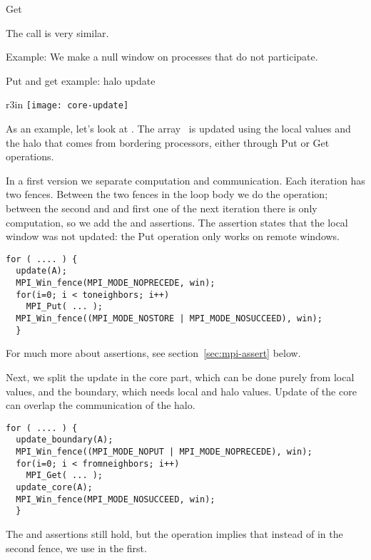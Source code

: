  {Get}

The  call is very similar.

Example:
%
%
We make a null window on processes that do not participate.
%

 {Put and get example: halo update}

\begin{wrapfigure}{r}{3in}
  \texttt{[image: core-update]}
\end{wrapfigure}
%
As an example, let's look at .
The array~ is updated using the local values and the halo
that comes from bordering processors, either through Put or Get operations.

In a first version we separate computation and communication.
Each iteration has two fences. Between the two fences in the loop body
we do the  operation; between the second and and first one
of the next iteration there is only computation, so we add the
 and  assertions. 
The  assertion
states that the local window was not updated: the Put operation only
works on remote windows.
\begin{lstlisting}
for ( .... ) {
  update(A); 
  MPI_Win_fence(MPI_MODE_NOPRECEDE, win); 
  for(i=0; i < toneighbors; i++) 
    MPI_Put( ... );
  MPI_Win_fence((MPI_MODE_NOSTORE | MPI_MODE_NOSUCCEED), win); 
  }
\end{lstlisting}
For much more about
assertions, see section~\ref{sec:mpi-assert} below.

Next, we split the update in the core part, which can be done purely
from local values, and the boundary, which needs local and halo
values. Update of the core can overlap the communication of the halo.
\begin{lstlisting}
for ( .... ) {
  update_boundary(A); 
  MPI_Win_fence((MPI_MODE_NOPUT | MPI_MODE_NOPRECEDE), win); 
  for(i=0; i < fromneighbors; i++) 
    MPI_Get( ... );
  update_core(A); 
  MPI_Win_fence(MPI_MODE_NOSUCCEED, win); 
  }
\end{lstlisting}
The  and 
 assertions still hold, but the
 operation implies that instead of  in the
second fence, we use  in the first.

